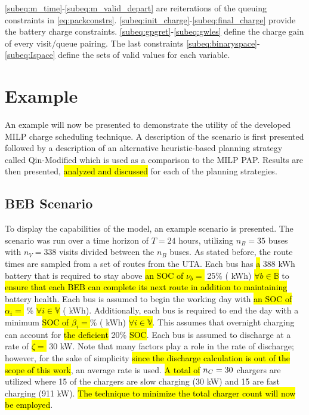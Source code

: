\documentclass[utf8]{FrontiersinHarvard}
\newcommand{\A}{35 }                                                            %
\newcommand{\N}{338 }                                                           %
\newcommand{\acharge}{0.9}                                                      %
\newcommand{\bcharge}{0.7 }                                                     %
\newcommand{\mincharge}{25\% }                                                  %
\newcommand{\minchargeD}{0.25 }                                                 %
\newcommand{\batsize}{388 }                                                     %
\newcommand{\fast}{15 }                                                         %
\newcommand{\slow}{15 }                                                         %
\newcommand{\fasts}{911 }                                                       %
\newcommand{\slows}{30 }                                                        %
\begin{document}
\autoref{subeq:m_time}-\autoref{subeq:m_valid_depart} are reiterations of the queuing constraints in
\autoref{eq:packconstrs}. \autoref{subeq:init_charge}-\autoref{subeq:final_charge} provide the battery charge
constraints. \autoref{subeq:gpgret}-\autoref{subeq:gwles} define the charge gain of every visit/queue pairing. The last
constraints \autoref{subeq:binaryspace}-\autoref{subeq:Ispace} define the sets of valid values for each variable.
\section{Example}
\label{sec:example}
An example will now be presented to demonstrate the utility of the developed MILP charge scheduling technique. A
description of the scenario is first presented followed by a description of an alternative heuristic-based planning
strategy called Qin-Modified which is used as a comparison to the MILP PAP. Results are then presented,
\hl{analyzed and discussed} for each of the planning strategies.

\subsection{BEB Scenario}
\label{beb-scenario}
To display the capabilities of the model, an example scenario is presented. The scenario was run over a time horizon of
\(T=24\) hours, utilizing \(n_B = \A\) buses with \(n_V = \N\) visits divided between the \(n_B\) buses. As stated before, the
route times are sampled from a set of routes from the UTA. Each bus has \hl{a} \batsize kWh battery that is
required to stay above \hl{an SOC of $\nu_b =$} \mincharge (\fpeval{\batsize * \minchargeD} kWh)
\hl{$\forall b \in \mathbb{B}$} to \hl{ensure that each BEB can complete its next route in addition to maintaining} battery health. Each bus is assumed to begin the working day with \hl{an SOC of $\alpha_i = $}
\fpeval{\acharge*100}\% \hl{$\forall i \in \mathbb{V}$} (\fpeval{\acharge * \batsize} kWh). Additionally, each bus is
required to end the day with a minimum \hl{ SOC of $\beta_i = $}\fpeval{\bcharge * 100}\%
(\fpeval{\bcharge * \batsize} kWh) \hl{$\forall i \in \mathbb{V}$}. This assumes that overnight charging
can account for \hl{the deficient} 20\% \hl{SOC}. Each bus is assumed to discharge at a rate of
\hl{$\zeta = $} 30 kW. Note that many factors play a role in the rate of discharge; however, for the sake of
simplicity \hl{since the discharge calculation is out of the scope of this work}, an average rate is used.
\hl{A total of} \(n_C = \fpeval{\fast + \slow}\) chargers are utilized where \slow of the chargers are slow
charging (\slows kW) and \fast are fast charging (\fasts kW). \hl{The technique to minimize the total charger count will now be employed}.
\end{document}
